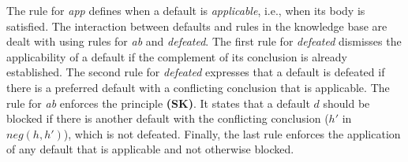 \documentclass{article}
\begin{document}
 
The rule for {\it app} defines when a default is \emph{applicable}, i.e., when its body is satisfied. The interaction between defaults and rules in the knowledge base are dealt with using rules for {\it ab} and {\it defeated}. The first rule
        for {\it defeated}  dismisses the applicability of a default if the complement of its conclusion is already established. The second rule for {\it defeated} expresses that a default is defeated if there is a  preferred default with a conflicting conclusion that is applicable.
The rule for {\it ab} enforces the principle {\bf (SK)}. It states that a default $d$ should be blocked if there is another default with the conflicting conclusion ($h'$ in $neg(h, h')$), which is not defeated.
Finally, the last rule  enforces the application of any default that is applicable and not otherwise blocked.
 
 \setcounter{equation}{13}
 
\end{document}
